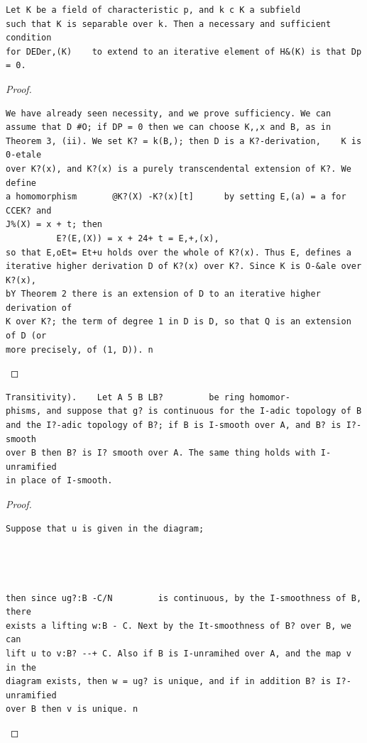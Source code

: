 \begin{theorem}\label{mcrt-auto-theorem-27-4}\uses{}
\begin{verbatim}
Let K be a field of characteristic p, and k c K a subfield
such that K is separable over k. Then a necessary and sufficient condition
for DEDer,(K)    to extend to an iterative element of H&(K) is that Dp = 0.
\end{verbatim}
\end{theorem}
\begin{proof}
\begin{verbatim}
We have already seen necessity, and we prove sufficiency. We can
assume that D #O; if DP = 0 then we can choose K,,x and B, as in
Theorem 3, (ii). We set K? = k(B,); then D is a K?-derivation,    K is 0-etale
over K?(x), and K?(x) is a purely transcendental extension of K?. We define
a homomorphism       @K?(X) -K?(x)[t]      by setting E,(a) = a for CCEK? and
J%(X) = x + t; then
          E?(E,(X)) = x + 24+ t = E,+,(x),
so that E,oEt= Et+u holds over the whole of K?(x). Thus E, defines a
iterative higher derivation D of K?(x) over K?. Since K is O-&ale over K?(x),
bY Theorem 2 there is an extension of D to an iterative higher derivation of
K over K?; the term of degree 1 in D is D, so that Q is an extension of D (or
more precisely, of (1, D)). n
\end{verbatim}
\end{proof}


\begin{theorem}\label{mcrt-auto-theorem-28-1}\uses{}
\begin{verbatim}
Transitivity).    Let A 5 B LB?         be ring homomor-
phisms, and suppose that g? is continuous for the I-adic topology of B
and the I?-adic topology of B?; if B is I-smooth over A, and B? is I?-smooth
over B then B? is I? smooth over A. The same thing holds with I-unramified
in place of I-smooth.
\end{verbatim}
\end{theorem}
\begin{proof}
\begin{verbatim}
Suppose that u is given in the diagram;




then since ug?:B -C/N         is continuous, by the I-smoothness of B, there
exists a lifting w:B - C. Next by the It-smoothness of B? over B, we can
lift u to v:B? --+ C. Also if B is I-unramihed over A, and the map v in the
diagram exists, then w = ug? is unique, and if in addition B? is I?-unramified
over B then v is unique. n
\end{verbatim}
\end{proof}


